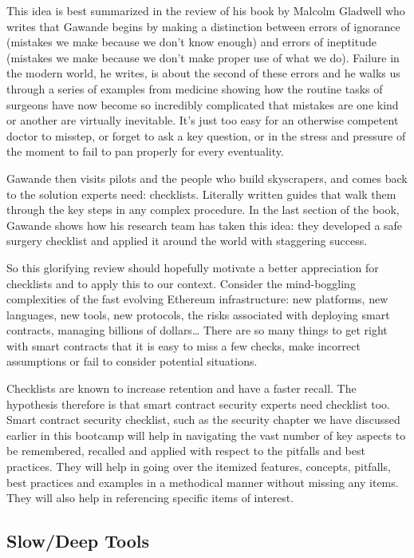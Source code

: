This idea is best summarized in the review of his book by Malcolm
Gladwell who writes that Gawande begins by making a distinction between
errors of ignorance (mistakes we make because we don't know enough) and
errors of ineptitude (mistakes we make because we don't make proper use
of what we do). Failure in the modern world, he writes, is about the
second of these errors and he walks us through a series of examples from
medicine showing how the routine tasks of surgeons have now become so
incredibly complicated that mistakes are one kind or another are
virtually inevitable. It's just too easy for an otherwise competent
doctor to misstep, or forget to ask a key question, or in the stress and
pressure of the moment to fail to pan properly for every eventuality.

Gawande then visits pilots and the people who build skyscrapers, and
comes back to the solution experts need: checklists. Literally written
guides that walk them through the key steps in any complex procedure. In
the last section of the book, Gawande shows how his research team has
taken this idea: they developed a safe surgery checklist and applied it
around the world with staggering success.

So this glorifying review should hopefully motivate a better
appreciation for checklists and to apply this to our context. Consider
the mind-boggling complexities of the fast evolving Ethereum
infrastructure: new platforms, new languages, new tools, new protocols,
the risks associated with deploying smart contracts, managing billions
of dollars\ldots{} There are so many things to get right with smart
contracts that it is easy to miss a few checks, make incorrect
assumptions or fail to consider potential situations.

Checklists are known to increase retention and have a faster recall. The
hypothesis therefore is that smart contract security experts need
checklist too. Smart contract security checklist, such as the security
chapter we have discussed earlier in this bootcamp will help in
navigating the vast number of key aspects to be remembered, recalled and
applied with respect to the pitfalls and best practices. They will help
in going over the itemized features, concepts, pitfalls, best practices
and examples in a methodical manner without missing any items. They will
also help in referencing specific items of interest.

\subsection{Slow/Deep Tools}\label{slowdeep-tools}

